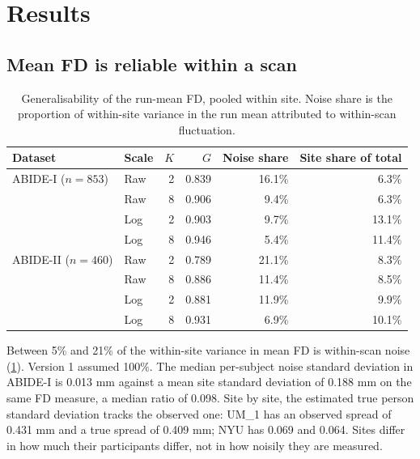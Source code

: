 \documentclass[11pt,a4paper]{article}
\begin{document}
\section{Results}

\subsection{Mean FD is reliable within a scan}

\begin{table}[H]
\centering
\caption{Generalisability of the run-mean FD, pooled within site. Noise share is the proportion of within-site variance in the run mean attributed to within-scan fluctuation.}
\label{tab:g}
\begin{tabular}{llrrrr}
\toprule
Dataset & Scale & $K$ & $G$ & Noise share & Site share of total \\
\midrule
ABIDE-I ($n = 853$) & Raw & 2 & 0.839 & 16.1\% & 6.3\% \\
 & Raw & 8 & 0.906 & 9.4\% & 6.3\% \\
 & Log & 2 & 0.903 & 9.7\% & 13.1\% \\
 & Log & 8 & 0.946 & 5.4\% & 11.4\% \\
ABIDE-II ($n = 460$) & Raw & 2 & 0.789 & 21.1\% & 8.3\% \\
 & Raw & 8 & 0.886 & 11.4\% & 8.5\% \\
 & Log & 2 & 0.881 & 11.9\% & 9.9\% \\
 & Log & 8 & 0.931 & 6.9\% & 10.1\% \\
\bottomrule
\end{tabular}
\end{table}

Between 5\% and 21\% of the within-site variance in mean FD is within-scan noise (\cref{tab:g}). Version 1 assumed 100\%. The median per-subject noise standard deviation in ABIDE-I is 0.013 mm against a mean site standard deviation of 0.188 mm on the same FD measure, a median ratio of 0.098. Site by site, the estimated true person standard deviation tracks the observed one: UM\_1 has an observed spread of 0.431 mm and a true spread of 0.409 mm; NYU has 0.069 and 0.064. Sites differ in how much their participants differ, not in how noisily they are measured.

\end{document}
